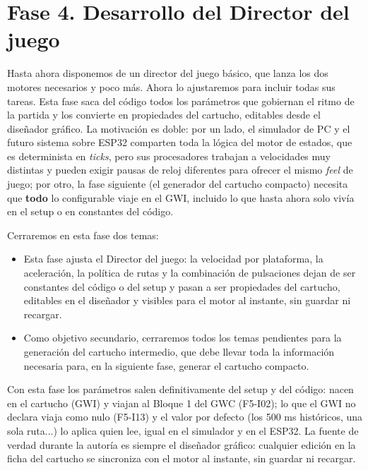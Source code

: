 \section{Fase 4. Desarrollo del Director del juego}
\label{sec:Fase4}

Hasta ahora disponemos de un director del juego básico, que lanza los dos motores necesarios y poco más. Ahora lo ajustaremos para incluir todas sus tareas. Esta fase saca del código todos los parámetros que gobiernan el ritmo de la partida y los convierte en propiedades del cartucho, editables desde el diseñador gráfico. La motivación es doble: por un lado, el simulador de PC y el futuro sistema sobre ESP32 comparten toda la lógica del motor de estados, que es determinista en \textit{ticks}, pero sus procesadores trabajan a velocidades muy distintas y pueden exigir pausas de reloj diferentes para ofrecer el mismo \textit{feel} de juego; por otro, la fase siguiente (el generador del cartucho compacto) necesita que \textbf{todo} lo configurable viaje en el GWI, incluido lo que hasta ahora solo vivía en el setup o en constantes del código.

Cerraremos en esta fase dos temas: 
\begin{itemize}
	\item Esta fase ajusta el Director del juego: la velocidad por plataforma, la aceleración, la política de rutas y la combinación de pulsaciones dejan de ser constantes del código o del setup y pasan a ser propiedades del cartucho, editables en el diseñador y visibles para el motor al instante, sin guardar ni recargar. 
	
	\item Como objetivo secundario, cerraremos todos los temas pendientes para la generación del cartucho intermedio, que debe llevar toda la información necesaria para, en la siguiente fase, generar el cartucho compacto.
\end{itemize}

Con esta fase los parámetros salen definitivamente del setup y del código: nacen en
el cartucho (GWI) y viajan al Bloque 1 del GWC (F5-I02); lo que el GWI no declara
viaja como nulo (F5-I13) y el valor por defecto (los 500 ms históricos, una sola ruta...) lo aplica quien lee, igual en el simulador y en el ESP32. La fuente de verdad
durante la autoría es siempre el diseñador gráfico: cualquier edición en la ficha del
cartucho se sincroniza con el motor al instante, sin guardar ni recargar.


\clearpage

